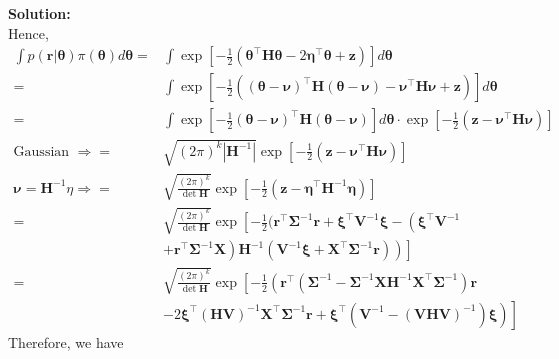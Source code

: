 \documentclass[13pt]{article}
\theoremstyle{definition}
\newenvironment{solution}
{\color{C2}\begin{framed}\begingroup\textbf{Solution:} }
  {\endgroup\end{framed}}
\theoremstyle{remark}
\begin{document}
\begin{solution}
$$$$
Hence,
$$
\begin{aligned}
\int p(\boldsymbol{r} | \boldsymbol{\theta}) \pi(\boldsymbol{\theta}) d \boldsymbol{\theta}= &\int\exp\left[-\frac{1}{2}\left(\boldsymbol{\theta}^{\top} \mathbf{H} \boldsymbol{\theta}-2 \boldsymbol{\eta}^{\top} \boldsymbol{\theta}+\boldsymbol{z}\right)\right]d \boldsymbol{\theta}\\
= & \int\exp\left[-\frac{1}{2}\left((\boldsymbol{\theta}-\bm{\nu})^{\top} \mathbf{H}(\boldsymbol{\theta}-\bm{\nu})-\bm{\nu}^{\top} \mathbf{H} \bm{\nu}+\boldsymbol{z}\right)\right]d \boldsymbol{\theta}\\
= & \int\exp\left[-\frac{1}{2}(\boldsymbol{\theta}-\bm{\nu})^{\top} \mathbf{H}(\boldsymbol{\theta}-\bm{\nu})\right]d \boldsymbol{\theta}\cdot \exp \left[-\frac{1}{2}\left(\boldsymbol{z}-\boldsymbol{\nu}^{\top} \mathbf{H} \boldsymbol{\nu}\right)\right]\\
\text{Gaussian }\Longrightarrow= & \sqrt{(2 \pi)^k|\mathbf{H}^{-1}|} \exp \left[-\frac{1}{2}\left(\boldsymbol{z}-\boldsymbol{\nu}^{\top} \mathbf{H} \boldsymbol{\nu}\right)\right] \\
\bm{\nu}=\mathbf{H}^{-1} \eta\Longrightarrow= & \sqrt{\frac{(2 \pi)^k}{\operatorname{det} \mathbf{H}}} \exp \left[-\frac{1}{2}\left(\boldsymbol{z}-\boldsymbol{\eta}^{\top} \mathbf{H}^{-1} \boldsymbol{\eta}\right)\right] \\
= & \sqrt{\frac{(2 \pi)^k}{\operatorname{det} \mathbf{H}}} \exp \left[-\frac{1}{2}(\bm{r}^\top \mathbf{\Sigma}^{-1} \boldsymbol{r}+\boldsymbol{\xi}^{\top} \boldsymbol{V}^{-1} \boldsymbol{\xi}-\left(\boldsymbol{\xi}^{\top} \boldsymbol{V}^{-1}\right.\right. \\
& \left.\left.\left.+\boldsymbol{r}^{\top} \mathbf{\Sigma}^{-1} \mathbf{X}\right) \mathbf{H}^{-1}\left(\boldsymbol{V}^{-1} \boldsymbol{\xi}+\mathbf{X}^{\top} \mathbf{\Sigma}^{-1} \boldsymbol{r}\right)\right)\right]\\
= & \sqrt{\frac{(2 \pi)^k}{\operatorname{det} \mathbf{H}}} \exp \left[-\frac{1}{2}\left(\bm{r}^\top \left(\mathbf{\Sigma}^{-1} - \mathbf{\Sigma}^{-1} \mathbf{X} \mathbf{H}^{-1} \mathbf{X}^{\top} \mathbf{\Sigma}^{-1}\right) \boldsymbol{r}\right. \right.\\
& \left.\left.-2 \boldsymbol{\xi}^{\top}(\mathbf{H} \boldsymbol{V})^{-1} \mathbf{X}^{\top} \mathbf{\Sigma}^{-1} \boldsymbol{r}+\boldsymbol{\xi}^{\top} (\boldsymbol{V}^{-1}-(\boldsymbol{V} \mathbf{H} \boldsymbol{V})^{-1} ) \boldsymbol{\xi}\right)\right]
\end{aligned}
$$
Therefore, we have
\begin{align*}

\end{align*}
\end{solution}
\end{document}
